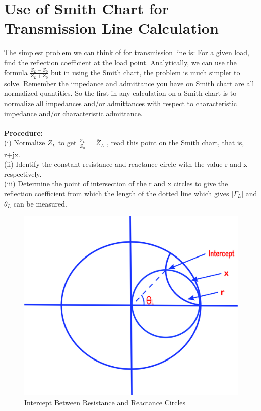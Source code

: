 \section{Use of Smith Chart for Transmission Line Calculation}
The simplest problem we can think of for transmission line is: For a given load, find the reflection coefficient at the load point. Analytically, we can use the formula $\frac{Z_L - Z_0}{Z_L + Z_0}$ but in using the Smith chart, the problem is much simpler to solve. Remember the impedance and admittance you have on Smith chart are all normalized quantities. So the first in any calculation on a Smith chart is to normalize all impedances and/or admittances with respect to characteristic impedance and/or characteristic admittance.\\\\
 \textbf{Procedure:}\\
 (i) Normalize $Z_{L}$ to get $\frac{Z_{L}}{Z_{0}}$ = $\overline{Z}_{L}$ , read this point on the Smith chart, that is,  r+jx.\\
 (ii) Identify the constant resistance and reactance circle with the value r and x respectively.\\ 
(iii) Determine the point of intersection of the r and x circles to give the reflection coefficient from which the length of the dotted line which gives $|\Gamma_L|$ and $\theta_L$ can be measured.
\begin{figure}[h]
\centering
\includegraphics[width=0.6\linewidth]{./graphics/lfds}
\caption{Intercept Between Resistance and Reactance Circles}
\label{fig:lfds}
\end{figure}

